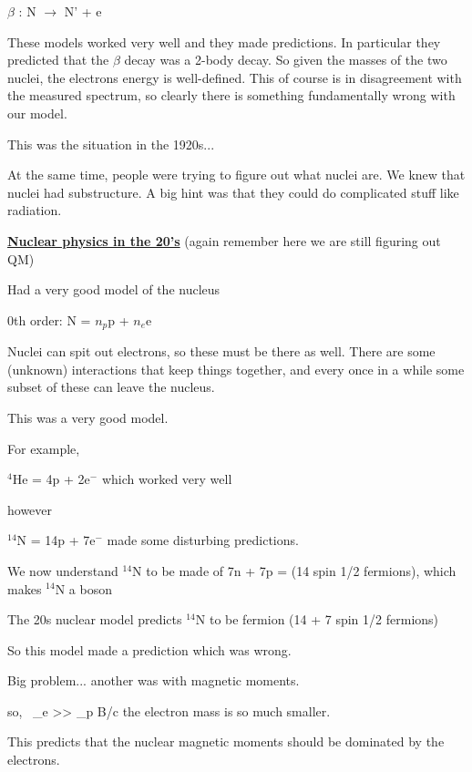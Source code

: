 {\begin{center}
$\beta$ : N $\rightarrow$ N' + e
\end{center}

These models worked very well and they made predictions. 
In particular they predicted that the $\beta$ decay was a 2-body decay. 
So given the masses of the two nuclei, the electrons energy is well-defined. 
This of course is in disagreement with the measured spectrum, so clearly there is something fundamentally wrong with our model. 

This was the situation in the 1920s...

At the same time, people were trying to figure out what nuclei are. 
We knew that nuclei had substructure. 
A big hint was that they could do complicated stuff like radiation.   

\textbf{\underline{Nuclear physics in the 20's}} (again remember here we are still figuring out QM)

Had a very good model of the nucleus

0th order:  N = $n_p$p + $n_e$e

Nuclei can spit out electrons, so these must be there as well.  
There are some (unknown) interactions that keep things together, and every once in a while some subset of these can leave the nucleus. 

This was a very good model. 

For example, 

\begin{center}
$^{4}$He = 4p + 2e$^-$ which worked very well
\end{center}

however 

\begin{center}
$^{14}$N = 14p + 7e$^-$ made some disturbing predictions.   
\end{center}

We now understand $^{14}$N to be made of 7n + 7p = (14 spin 1/2 fermions), which makes $^{14}$N a boson

The 20s nuclear model predicts $^{14}$N to be fermion (14 + 7 spin 1/2 fermions)

So this model made a prediction which was wrong. 

Big problem... another was with magnetic moments. 

\be
\mu \propto {}  \hspace{0.2in} \textrm{so,  }\ \mu_e >> \mu_p
\ee
B/c the electron mass is so much smaller. 

This predicts that the nuclear magnetic moments should be dominated by the electrons. 

}
